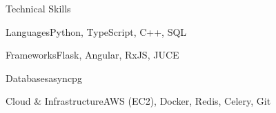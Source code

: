 \documentclass[
	11pt
]{../../template}
\begin{document}
	\begin{rSection}{T}{echnical Skills}
		\begin{rSet}{Languages}{Python, TypeScript, C++, SQL}
		\end{rSet}
		\begin{rSet}{Frameworks}{Flask, Angular, RxJS, JUCE}
		\end{rSet}
		\begin{rSet}{Databases}{asyncpg}
		\end{rSet}
		\begin{rSet}{Cloud \& Infrastructure}{AWS (EC2), Docker, Redis, Celery, Git}
		\end{rSet}
	\end{rSection}
\end{document}
